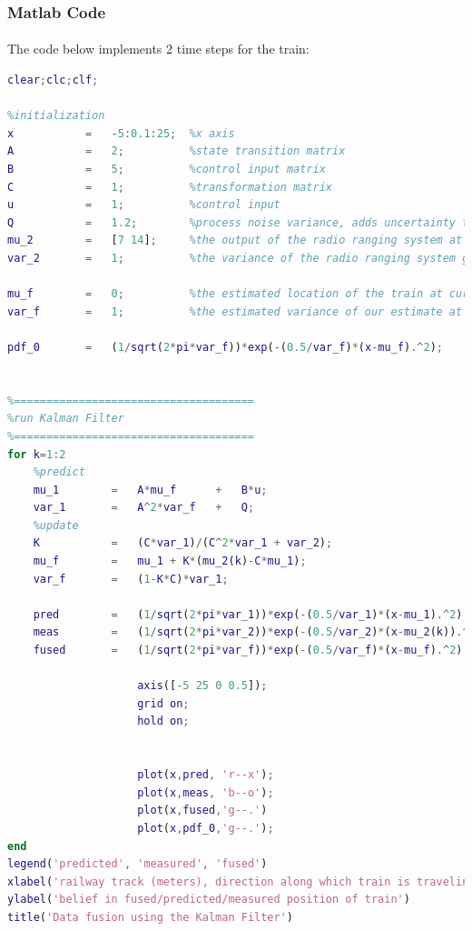 \begin{frame}\pw\Large
\frametitle{Matlab Code}
\framesubtitle{}

\scriptsize
The code below implements 2 time steps for the train:
\tinyvvv \begin{lstlisting}[language=Matlab]
clear;clc;clf;

%initialization
x           =   -5:0.1:25;  %x axis
A           =   2;          %state transition matrix
B           =   5;          %control input matrix
C           =   1;          %transformation matrix
u           =   1;          %control input
Q           =   1.2;        %process noise variance, adds uncertainty to prediction
mu_2        =   [7 14];     %the output of the radio ranging system at next two times
var_2       =   1;          %the variance of the radio ranging system given by manufacturer

mu_f        =   0;          %the estimated location of the train at current time, k=0
var_f       =   1;          %the estimated variance of our estimate at current time, k=0

pdf_0       =   (1/sqrt(2*pi*var_f))*exp(-(0.5/var_f)*(x-mu_f).^2);


%=====================================
%run Kalman Filter
%=====================================
for k=1:2
    %predict
    mu_1        =   A*mu_f      +   B*u;
    var_1       =   A^2*var_f   +   Q;
    %update
    K           =   (C*var_1)/(C^2*var_1 + var_2);
    mu_f        =   mu_1 + K*(mu_2(k)-C*mu_1);
    var_f       =   (1-K*C)*var_1;
    
    pred        =   (1/sqrt(2*pi*var_1))*exp(-(0.5/var_1)*(x-mu_1).^2);
    meas        =   (1/sqrt(2*pi*var_2))*exp(-(0.5/var_2)*(x-mu_2(k)).^2);
    fused       =   (1/sqrt(2*pi*var_f))*exp(-(0.5/var_f)*(x-mu_f).^2);
    
                    axis([-5 25 0 0.5]); 
                    grid on;
                    hold on;


                    plot(x,pred, 'r--x');
                    plot(x,meas, 'b--o');
                    plot(x,fused,'g--.')
                    plot(x,pdf_0,'g--.');                    
end
legend('predicted', 'measured', 'fused')
xlabel('railway track (meters), direction along which train is traveling ->')
ylabel('belief in fused/predicted/measured position of train')
title('Data fusion using the Kalman Filter')
\end{lstlisting}
\end{frame}








